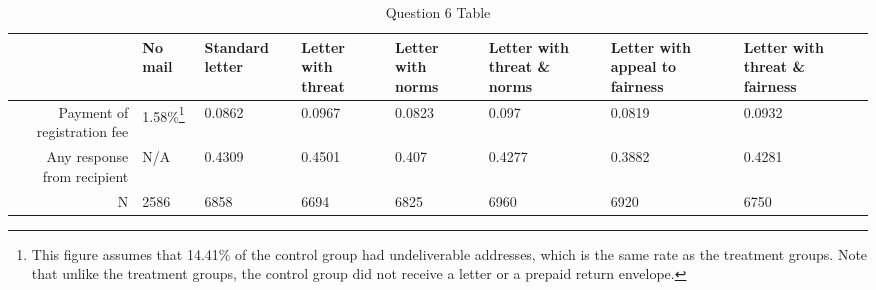 \documentclass[11pt,notitlepage]{article}\usepackage[]{graphicx}\usepackage[]{color}
\begin{document}
\begin{table}[H]
  \centering
  \caption{Question 6 Table}
    \begin{tabular}{rC{1.5cm}C{1.5cm}C{1.5cm}C{1.5cm}C{1.5cm}C{1.5cm}C{1.5cm}}
    \toprule
          & No mail  & Standard letter  & Letter with threat  & Letter with norms  & Letter with threat \& norms  & Letter with appeal to fairness  & Letter with threat \& fairness  \\
    \midrule
    Payment of registration fee  & 1.58\%\footnote{This figure assumes that 14.41\% of the control group had undeliverable addresses, which is the same rate as the treatment groups. Note that unlike the treatment groups, the control group did not receive a letter or a prepaid return envelope.}  & 0.0862 & 0.0967 & 0.0823 & 0.097 & 0.0819 & 0.0932 \\
    Any response from recipient  & N/A   & 0.4309 & 0.4501 & 0.407 & 0.4277 & 0.3882 & 0.4281 \\
    N     & 2586  & 6858  & 6694  & 6825  & 6960  & 6920  & 6750 \\
    \bottomrule
    \end{tabular}%
  \label{tab:addlabel}%
\end{table}%
\end{document}
